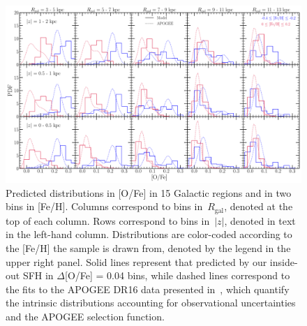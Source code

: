 \documentclass[fleqn, usenatbib]{mnras}
\begin{document}
\begin{figure} 
\centering 
\includegraphics[scale = 0.32]{ofe_mdfs.pdf} 
\caption{Predicted distributions in [O/Fe] in 15 Galactic regions and in two 
bins in [Fe/H]. Columns correspond to bins in~$R_\text{gal}$, denoted at the 
top of each column. Rows correspond to bins in~$\left|z\right|$, denoted in 
text in the left-hand column. Distributions are color-coded according to the 
[Fe/H] the sample is drawn from, denoted by the legend in the upper right 
panel. Solid lines represent that predicted by our inside-out SFH in 
$\Delta$[O/Fe] = 0.04 bins, while dashed lines correspond to the fits to the 
APOGEE DR16 data presented in~\citet{Vincenzo2021a}, which quantify the 
intrinsic distributions accounting for observational uncertainties and the 
APOGEE selection function. } 
\label{fig:ofe_mdfs_insideout} 
\end{figure} 
\end{document}
